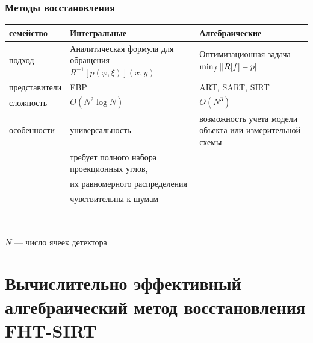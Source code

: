 \documentclass[12pt]{beamer}
\begin{document}
\begingroup
\small
\begin{frame}
\frametitle{Методы восстановления}
\begin{tabular}{p{} | p{} | p{}}
\hspace{-1cm} семейство & Интегральные & Алгебраические \\ \hline
\hspace{-1cm} подход & Аналитическая формула для обращения $R^{-1}[p(\varphi, \xi)](x,y)$ & Оптимизационная задача $\min_{f} \left|\left| R[f] - p \right|\right|$\\ \hline
\hspace{-1cm} представители & FBP & ART, SART, SIRT \\ \hline
\hspace{-1cm} сложность & $O(N^2 \log N)$ & $O(N^3)$ \\ \hline
\hspace{-1cm} особенности & универсальность & возможность учета \hspace{1cm} модели объекта или измерительной схемы \\
                          & требует полного набора проекционных углов, & \\ 
                          & их равномерного распределения & \\
                          & чувствительны к шумам & \\
\end{tabular}
\\
\vspace{0.5cm}

$N$ --- число ячеек детектора
\end{frame}
\endgroup


\section{Вычислительно эффективный алгебраический метод восстановления FHT-SIRT}
\end{document}
